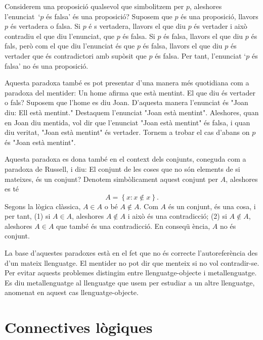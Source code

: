 \begin{observacio}
Considerem una proposici\'{o} qualsevol que simbolitzem per $p$, aleshores
l'enunciat\ `$p$ \'{e}s falsa' \'{e}s una proposici\'{o}? Suposem que $p$
\'{e}s una proposici\'{o}, llavors $p$ \'{e}s vertadera o falsa. Si $p$ \'{e}%
s vertadera, llavors el que diu $p$ \'{e}s vertader i aix\`{o} contradiu el
que diu l'enunciat, que $p$ \'{e}s falsa. Si $p$ \'{e}s falsa, llavors el
que diu $p$ \'{e}s fals, per\`{o} com el que diu l'enunciat \'{e}s que $p$
\'{e}s falsa, llavors el que diu $p$ \'{e}s vertader que \'{e}s
contradictori amb sup\`{o}sit que $p$ \'{e}s falsa. Per tant, l'enunciat `$p$
\'{e}s falsa' no \'{e}s una proposici\'{o}.

Aquesta paradoxa tamb\'{e} es pot presentar d'una manera m\'{e}s quotidiana
com a paradoxa del mentider: Un home afirma que est\`{a} mentint. El que diu
\'{e}s vertader o fals? Suposem que l'home es diu Joan. D'aquesta manera
l'enunciat \'{e}s "Joan diu: Ell est\`{a} mentint." Destaquem l'enunciat
"Joan est\`{a} mentint". Aleshores, quan en Joan diu mentida, vol dir que
l'enunciat "Joan est\`{a} mentint" \'{e}s falsa, i quan diu veritat, "Joan
est\`{a} mentint" \'{e}s vertader. Tornem a trobar el cas d'abans on $p$
\'{e}s "Joan est\`{a} mentint".

Aquesta paradoxa es dona tamb\'{e} en el context dels conjunts, coneguda com
a paradoxa de Russell, i diu: El conjunt de les coses que no s\'{o}n
elements de si mateixes, \'{e}s un conjunt? Denotem simb\`{o}licament aquest
conjunt per $A$, aleshores es t\'{e}%
\begin{equation*}
A=\left\{ x:x\notin x\right\} .
\end{equation*}
Segons la l\`{o}gica cl\`{a}ssica, $A\in A$ o b\'{e} $A\notin A$. Com $A$
\'{e}s un conjunt, \'{e}s una cosa, i per tant, (1) si $A\in A$, aleshores $%
A\notin A$ i aix\`{o} \'{e}s una contradicci\'{o}; (2) si $A\notin A$,
aleshores $A\in A$ que tamb\'{e} \'{e}s una contradicci\'{o}. En conseq\"{u}%
\`{e}ncia, $A$ no \'{e}s conjunt.

La base d'aquestes paradoxes est\`{a} en el fet que no \'{e}s correcte
l'autorefer\`{e}ncia des d'un mateix llenguatge. El mentider no pot dir que
menteix si no vol contradir-se. Per evitar aquests problemes distingim entre
llenguatge-objecte i metallenguatge. Es diu metallenguatge al llenguatge que
usem per estudiar a un altre llenguatge, anomenat en aquest cas
llenguatge-objecte.
\end{observacio}

\section{Connectives l\`{o}giques}

